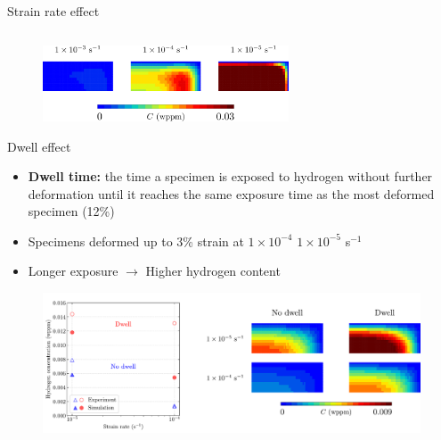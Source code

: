 \documentclass[9pt]{beamer}
\begin{document}
\begin{frame}{Strain rate effect}
\begin{columns}
\begin{column}{0.45\textwidth}
\end{column}
\end{columns}

\begin{figure}
		\centering
		\includegraphics[width=0.65\textwidth]{Images/C_field_strain_rate_effect.pdf} \\
	\end{figure}

\end{frame}


\begin{frame}{Dwell effect}

\begin{itemize}
	\item \textbf{Dwell time:} the time a specimen is exposed to hydrogen without further deformation until it reaches the same exposure time as the most deformed specimen (12\%)
	\vspace{0.25cm}
	\item Specimens deformed up to 3\% strain at $1\times10^{-4}$ $1\times10^{-5}$ s$^{-1}$
	\vspace{0.25cm}
	\item Longer exposure $\rightarrow$ Higher hydrogen content
\end{itemize}

\begin{figure}
	\centering
	\includegraphics[width=\textwidth]{Images/Dwell_No_Dwell.pdf} 
\end{figure}

\end{frame}

\end{document}
